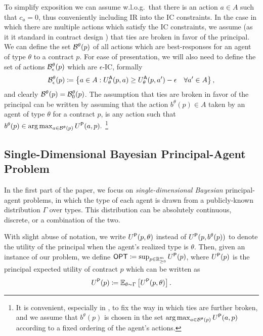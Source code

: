 To simplify exposition we can assume w.l.o.g.~that there is an action $a\in A$ such that $c_a=0$, thus conveniently including IR into the IC constraints. In the case in which there are multiple actions which satisfy the IC constraints, we assume (as it it standard in contract design \citep{carroll2015robustness}) that ties are broken in favor of the principal. We can define the set $\mathcal{B}^\theta(p)$ of all actions which are best-responses for an agent of type $\theta$ to a contract $p$. For ease of presentation, we will also need to define the set of actions $\mathcal{B}_\epsilon^\theta(p)$ which are $\epsilon$-IC, formally
\[
{\mathcal{B}}^{\theta}_\epsilon(p)\coloneqq\left\{a\in A: U^\textsf{A}_\theta(p,a) \ge U^\textsf{A}_\theta(p,a')-\epsilon\quad\forall a'\in A\right\},
\]
and clearly ${\mathcal{B}}^{\theta}(p)={\mathcal{B}}^{\theta}_0(p)$. The assumption that ties are broken in favor of the principal can be written by assuming that the action $b^\theta(p)\in A$ taken by an agent of type $\theta$ for a contract $p$, is any action such that
$b^\theta(p)\in \arg \max_{a \in \mathcal{B}^{\theta}(p)} U^\textsf{P}(a,p).$ \footnote{It is convenient, especially in , to fix the way in which ties are further broken, and we assume that $b^\theta(p)$ is chosen in the set $\arg \max_{a \in \mathcal{B}^{\theta}(p)} U^\textsf{P}(a,p)$ according to a fixed ordering of the agent's actions.}

\subsection{Single-Dimensional Bayesian Principal-Agent Problem}

In the first part of the paper, we focus on \emph{single-dimensional Bayesian} principal-agent problems, in which the type of each agent is drawn from a publicly-known distribution $\Gamma$ over types. This distribution can be absolutely continuous, discrete, or a combination of the two.

With slight abuse of notation, we write $U^\textsf{P}(p,\theta)$ instead of $U^\textsf{P}(p,b^\theta(p))$ to denote the utility of the principal when the agent's realized type is $\theta$.
Then, given an instance of our problem, we define $\textsf{OPT}\coloneqq\sup_{p\in\mathbb{R}_{\ge 0}^m}U^\textsf{P}(p)$, where $U^\textsf{P}(p)$ is the principal expected utility of contract $p$ which can be written as
\[
U^\textsf{P}(p)\coloneqq\mathbb{E}_{\theta \sim \Gamma} \left[U^\textsf{P}(p,\theta)\right].
\]

